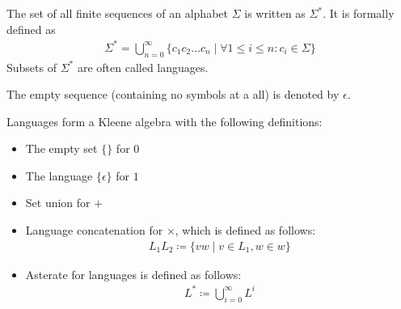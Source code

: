 \begin{definition}
    The set of all finite sequences of an alphabet $\Sigma$ is written as $\Sigma^\ast$.
    It is formally defined as
    \begin{align}
        \Sigma^\ast = \bigcup\limits_{n=0}^\infty \{c_1 c_2 \ldots c_n \mid \forall 1 \le i \le n: c_i \in \Sigma \}
    \end{align}
    Subsets of $\Sigma^\ast$ are often called languages.
\end{definition}

The empty sequence (containing no symbols at a all) is denoted by $\epsilon$.

\begin{theorem}
    Languages form a Kleene algebra with the following definitions:
    \begin{itemize}
        \item The empty set $\{\}$ for $0$
        \item The language $\{ \epsilon \}$ for $1$
        \item Set union for $+$
        \item Language concatenation for $\times$, which is defined as follows:
            \begin{align}
                L_1 L_2 \coloneqq \{ v w \mid v \in L_1, w \in w \}
            \end{align}
        \item Asterate for languages is defined as follows:
            \begin{align}
                L^\ast \coloneqq \bigcup\limits_{i = 0}^\infty L^i
            \end{align}
    \end{itemize}
\end{theorem}
